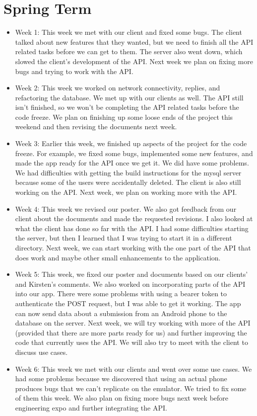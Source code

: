 \documentclass[onecolumn, draftclsnofoot,10pt, compsoc]{IEEEtran}
\begin{document}
\section{Spring Term}
 \begin{itemize}
     \item Week 1: This week we met with our client and fixed some bugs. The client talked about new features that they wanted, but we need to finish all the API related tasks before we can get to them. The server also went down, which slowed the client's development of the API. Next week we plan on fixing more bugs and trying to work with the API.
     \item Week 2: This week we worked on network connectivity, replies,  and refactoring the database. We met up with our clients as well. The API still isn't finished, so we won't be completing the API related tasks before the code freeze. We plan on finishing up some loose ends of the project this weekend and then revising the documents next week.
     \item Week 3: Earlier this week, we finished up aspects of the project for the code freeze. For example, we fixed some bugs, implemented some new features, and made the app ready for the API once we get it. We did have some problems. We had difficulties with getting the build instructions for the mysql server because some of the users were accidentally deleted. The client is also still working on the API. Next week, we plan on working more with the API.
     \item Week 4: This week we revised our poster. We also got feedback from our client about the documents and made the requested revisions. I also looked at what the client has done so far with the API. I had some difficulties starting the server, but then I learned that I was trying to start it in a different directory. Next week, we can start working with the one part of the API that does work and maybe other small enhancements to the application.
     \item Week 5: This week, we fixed our poster and documents based on our clients' and Kirsten's comments. We also worked on incorporating parts of the API into our app. There were some problems with using a bearer token to authenticate the POST request, but I was able to get it working. The app can now send data about a submission from an Android phone to the database on the server. Next week, we will try working with more of the API (provided that there are more parts ready for us) and further improving the code that currently uses the API. We will also try to meet with the client to discuss use cases.
     \item Week 6: This week we met with our clients and went over some use cases. We had some problems because we discovered that using an actual phone produces bugs that we can't replicate on the emulator. We tried to fix some of them this week. We also plan on fixing more bugs next week before engineering expo and further integrating the API.
 \end{itemize}

\clearpage


%
 
\end{document}
